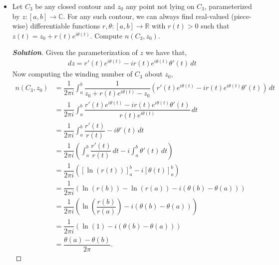 \documentclass[11pt]{article}
\newenvironment{problem}[2][Problem\!]{\begin{trivlist}
\item[\hskip \labelsep {\bfseries #1}\hskip \labelsep {\bfseries #2}]}{\end{trivlist}}
\newenvironment{solution}{\begin{proof}[\textbf{\textit{Solution}}] }{\end{proof}}
\newcommand{\rr}{\mathbb R}   %
\newcommand{\cc}{\mathbb C}   %
\newcommand{\lrp}[1]{\left(#1\right)}
\newcommand{\lrb}[1]{\left[#1\right]}
\begin{document}
\begin{problem}{7.3}
\begin{itemize}[itemsep=3em]
\item[(c)] Let $C_3$ be any closed contour and $z_0$ any point not lying on $C_3$, parameterized by $z:[a,b] \to \cc$. For any such contour, we can always find real-valued (piece-wise) differentiable functions $r,\theta :[a,b] \to \rr$ with $r(t)>0$ such that $z(t) = z_0 + r(t) e^{i\theta(t)}$. Compute $n(C_3,z_0)$.  
\begin{solution}
  Given the parameterization of $z$ we have that,
  \begin{align*}
    dz = r'(t)e^{i\theta(t)}- i r(t) e^{i\theta(t)}\theta'(t) \, dt
  \end{align*}
  Now computing the winding number of $C_3$ about $z_0$,
  \begin{align*}
    n(C_3, z_0) &= \dfrac{1}{2\pi i}\int_a^{b}\dfrac{1}{z_0 + r(t)e^{i\theta(t)} - z_0}(r'(t)e^{i\theta(t)}- i r(t) e^{i\theta(t)}\theta'(t)) \, dt \\
    &= \dfrac{1}{2\pi i}\int_a^{b} \dfrac{r'(t)e^{i\theta(t)}- i r(t) e^{i\theta(t)}\theta'(t)}{r(t)e^{i\theta(t)}}\, dt  \\
    &= \dfrac{1}{2\pi i}\int_a^{b}\dfrac{r'(t)}{r(t)} - i\theta'(t) \, dt \\
    &= \dfrac{1}{2\pi i }\lrp{\int_a^{b}\dfrac{r'(t)}{r(t)}\, dt - i\int_a^{b}\theta'(t)\, dt} \\
    &= \dfrac{1}{2\pi i }\lrp{\lrb{\ln(r(t))}_a^{b} - i \lrb{\theta(t)}_a^{b}} \\
    &= \dfrac{1}{2\pi i }\lrp{\ln(r(b)) - \ln(r(a)) -i(\theta(b) - \theta(a))} \\
    &= \dfrac{1}{2\pi i }\lrp{\ln\lrp{\dfrac{r(b)}{r(a)}} - i(\theta(b)-\theta(a))} \\
    &= \dfrac{1}{2 \pi i}\lrp{\ln(1) -i(\theta(b)-\theta(a))} \\
    &= \dfrac{\theta(a)-\theta(b)}{2\pi  }.
  \end{align*}
  
\end{solution}

\end{itemize}
\end{problem}

\newpage  %
\end{document}
